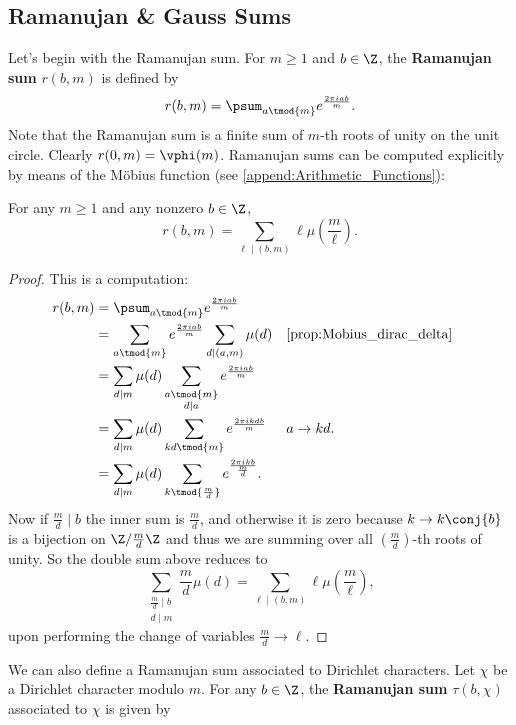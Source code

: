       \subsection*{Ramanujan \& Gauss Sums}
        Let's begin with the Ramanujan sum. For $m \ge 1$ and $b \in \Z$, the \textbf{Ramanujan sum} $r(b,m)$ is defined by
        \[
          r(b,m) = \psum_{a \tmod{m}}e^{\frac{2\pi iab}{m}}.
        \]
        Note that the Ramanujan sum is a finite sum of $m$-th roots of unity on the unit circle. Clearly $r(0,m) = \vphi(m)$. Ramanujan sums can be computed explicitly by means of the M\"obius function (see \cref{append:Arithmetic_Functions}):

        \begin{proposition}\label{prop:Ramanujan_sum_evaluation}
          For any $m \ge 1$ and any nonzero $b \in \Z$,
          \[
            r(b,m) = \sum_{\ell \mid (b,m)}\ell\mu\left(\frac{m}{\ell}\right).
          \]
        \end{proposition}
        \begin{proof}
          This is a computation:
          \begin{align*}
            r(b,m) &= \psum_{a \tmod{m}}e^{\frac{2\pi iab}{m}} \\
            &= \sum_{a \tmod{m}}e^{\frac{2\pi iab}{m}}\sum_{d \mid (a,m)}\mu(d) && \text{\cref{prop:Mobius_dirac_delta}} \\
            &= \sum_{d \mid m}\mu(d)\sum_{\substack{a \tmod{m} \\ d \mid a}}e^{\frac{2\pi iab}{m}} \\
            &= \sum_{d \mid m}\mu(d)\sum_{kd \tmod{m}}e^{\frac{2\pi ikdb}{m}} && \text{$a \to kd$.} \\
            &= \sum_{d \mid m}\mu(d)\sum_{k \tmod{\frac{m}{d}}}e^{\frac{2\pi ik b}{\frac{m}{d}}}.
          \end{align*}
          Now if $\frac{m}{d} \mid b$ the inner sum is $\frac{m}{d}$, and otherwise it is zero because $k \to k\conj{b}$ is a bijection on $\Z/\frac{m}{d}\Z$ and thus we are summing over all $\left(\frac{m}{d}\right)$-th roots of unity. So the double sum above reduces to
          \[
            \sum_{\substack{\frac{m}{d} \mid b \\ d \mid m}}\frac{m}{d}\mu(d) = \sum_{\ell \mid (b,m)}\ell\mu\left(\frac{m}{\ell}\right),
          \]
          upon performing the change of variables $\frac{m}{d} \to \ell$.
        \end{proof}
        We can also define a Ramanujan sum associated to Dirichlet characters. Let $\chi$ be a Dirichlet character modulo $m$. For any $b \in \Z$, the \textbf{Ramanujan sum} $\tau(b,\chi)$ associated to $\chi$ is given by
